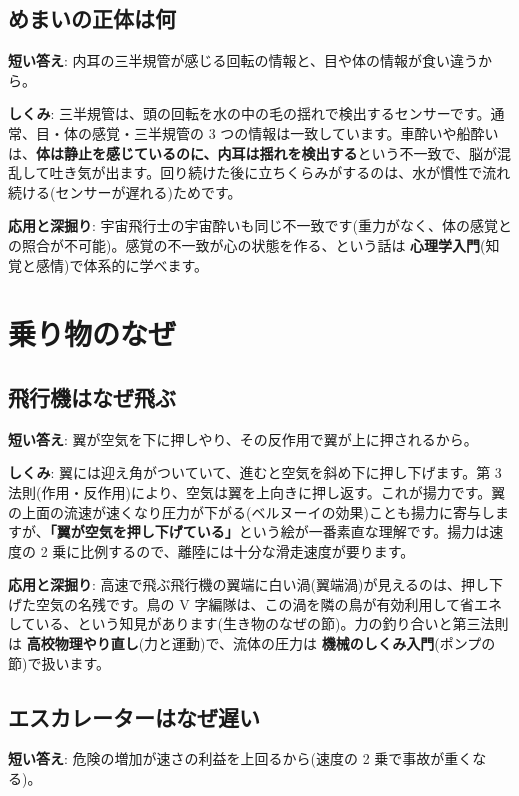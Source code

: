 \documentclass{article}
\begin{document}
\subsection{めまいの正体は何}

\textbf{短い答え}: 内耳の三半規管が感じる回転の情報と、目や体の情報が食い違うから。

\textbf{しくみ}: 三半規管は、頭の回転を水の中の毛の揺れで検出するセンサーです。通常、目・体の感覚・三半規管の 3 つの情報は一致しています。車酔いや船酔いは、\textbf{体は静止を感じているのに、内耳は揺れを検出する}という不一致で、脳が混乱して吐き気が出ます。回り続けた後に立ちくらみがするのは、水が慣性で流れ続ける(センサーが遅れる)ためです。

\textbf{応用と深掘り}: 宇宙飛行士の宇宙酔いも同じ不一致です(重力がなく、体の感覚との照合が不可能)。感覚の不一致が心の状態を作る、という話は \textbf{心理学入門}(知覚と感情)で体系的に学べます。

\section{乗り物のなぜ}

\subsection{飛行機はなぜ飛ぶ}

\textbf{短い答え}: 翼が空気を下に押しやり、その反作用で翼が上に押されるから。

\textbf{しくみ}: 翼には迎え角がついていて、進むと空気を斜め下に押し下げます。第 3 法則(作用・反作用)により、空気は翼を上向きに押し返す。これが揚力です。翼の上面の流速が速くなり圧力が下がる(ベルヌーイの効果)ことも揚力に寄与しますが、\textbf{「翼が空気を押し下げている」}という絵が一番素直な理解です。揚力は速度の 2 乗に比例するので、離陸には十分な滑走速度が要ります。

\textbf{応用と深掘り}: 高速で飛ぶ飛行機の翼端に白い渦(翼端渦)が見えるのは、押し下げた空気の名残です。鳥の V 字編隊は、この渦を隣の鳥が有効利用して省エネしている、という知見があります(生き物のなぜの節)。力の釣り合いと第三法則は \textbf{高校物理やり直し}(力と運動)で、流体の圧力は \textbf{機械のしくみ入門}(ポンプの節)で扱います。

\subsection{エスカレーターはなぜ遅い}

\textbf{短い答え}: 危険の増加が速さの利益を上回るから(速度の 2 乗で事故が重くなる)。
\end{document}

